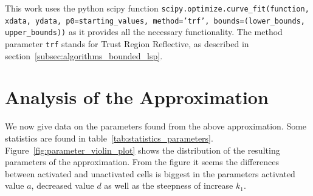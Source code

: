 This work uses the python scipy function \texttt{scipy.optimize.curve\_fit(function, xdata, ydata, p0=starting\_values, method='trf', bounds=(lower\_bounds, upper\_bounds))} as it provides all the necessary functionality. The method parameter \texttt{trf} stands for Trust Region Reflective, as described in section~\ref{subsec:algorithms_bounded_lsp}.

\newpage
\section{Analysis of the Approximation}
\label{sec:analysis_of_approximation}

We now give data on the parameters found from the above approximation. Some statistics are found in table~\ref{tab:statistics_parameters}. Figure~\ref{fig:parameter_violin_plot} shows the distribution of the resulting parameters of the approximation. From the figure it seems the differences between activated and unactivated cells is biggest in the parameters activated value $a$, decreased value $d$ as well as the steepness of increase $k_1$.

